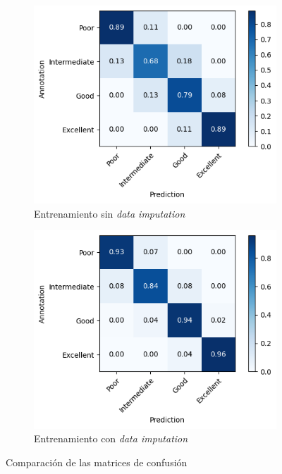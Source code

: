 \documentclass{article}
\begin{document}
\begin{figure}[!h]
				\centering
     			\begin{subfigure}[b]{0.4\textwidth}
         			\centering
         			\includegraphics[scale=0.4]{cmfinalsin.png}
         		\caption{Entrenamiento sin \textit{data imputation}}
         		\end{subfigure}
         		\hfill
     			\begin{subfigure}[b]{0.4\textwidth}
       				\centering
         			\includegraphics[scale=0.4]{cmfinalcon.png}
         			\caption{Entrenamiento con \textit{data imputation}}
    		 	\end{subfigure}
    		 	\caption{Comparaci\'on de las matrices de confusi\'on}
    		 	\label{confusion-final}
			\end{figure}
\end{document}
